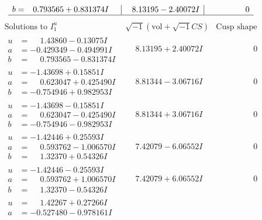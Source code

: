 \documentclass[1p]{elsarticle_modified}
\theoremstyle{definition}
\newcommand{\I}{\sqrt{-1}}
\begin{document}
$$\begin{array}{c|c|c}
\begin{aligned}
b &= \phantom{-}0.793565 + 0.831374 I\end{aligned}
 & \phantom{-}8.13195 - 2.40072 I & \phantom{-0.000000 } 0\\
 \hline 
 \end{array}$$\newpage$$\begin{array}{c|c|c}  
\text{Solutions to }I^u_{1}& \I (\text{vol} + \sqrt{-1}CS) & \text{Cusp shape}\\
 \hline 
\begin{aligned}
u &= \phantom{-}1.43860 - 0.13075 I \\
a &= -0.429349 - 0.494991 I \\
b &= \phantom{-}0.793565 - 0.831374 I\end{aligned}
 & \phantom{-}8.13195 + 2.40072 I & \phantom{-0.000000 } 0 \\ \hline\begin{aligned}
u &= -1.43698 + 0.15851 I \\
a &= \phantom{-}0.623047 + 0.425490 I \\
b &= -0.754946 + 0.982953 I\end{aligned}
 & \phantom{-}8.81344 - 3.06716 I & \phantom{-0.000000 } 0 \\ \hline\begin{aligned}
u &= -1.43698 - 0.15851 I \\
a &= \phantom{-}0.623047 - 0.425490 I \\
b &= -0.754946 - 0.982953 I\end{aligned}
 & \phantom{-}8.81344 + 3.06716 I & \phantom{-0.000000 } 0 \\ \hline\begin{aligned}
u &= -1.42446 + 0.25593 I \\
a &= \phantom{-}0.593762 - 1.006570 I \\
b &= \phantom{-}1.32370 + 0.54326 I\end{aligned}
 & \phantom{-}7.42079 - 6.06552 I & \phantom{-0.000000 } 0 \\ \hline\begin{aligned}
u &= -1.42446 - 0.25593 I \\
a &= \phantom{-}0.593762 + 1.006570 I \\
b &= \phantom{-}1.32370 - 0.54326 I\end{aligned}
 & \phantom{-}7.42079 + 6.06552 I & \phantom{-0.000000 } 0 \\ \hline\begin{aligned}
u &= \phantom{-}1.42267 + 0.27266 I \\
a &= -0.527480 - 0.978161 I \\

\end{aligned}
\end{array}$$
\end{document}
